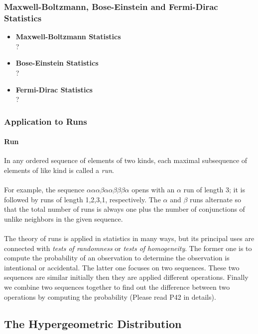 \documentclass{article}
\numberwithin{equation}{subsection}
\begin{document}
		\subsubsection{Maxwell-Boltzmann, Bose-Einstein and Fermi-Dirac Statistics}
		\begin{itemize}
		\item \textbf{Maxwell-Boltzmann Statistics} \\ ?
		\item \textbf{Bose-Einstein Statistics} \\ ?
		\item \textbf{Fermi-Dirac Statistics} \\ ?
		\end{itemize}
		\subsubsection{Application to Runs}
		\paragraph{Run} In any ordered sequence of elements of two kinds, each maximal subsequence of elements of like kind is called a \textit{run}. 
		\paragraph{} For example, the sequence $\alpha\alpha\alpha\beta\alpha\alpha\beta\beta\beta\alpha$ opens with an $\alpha$ run of length 3; it is followed by runs of length 1,2,3,1, respectively. The $\alpha$ and $\beta$ runs alternate so that the total number of runs is always one plus the number of conjunctions of unlike neighbors in the given sequence.
		\paragraph{} The theory of runs is applied in statistics in many ways, but its principal uses are connected with \textit{tests of randomness} or \textit{tests of homogeneity}. The former one is to compute the probability of an observation to determine the observation is intentional or accidental. The latter one focuses on two sequences. These two sequences are similar initially then they are applied different operations. Finally we combine two sequences together to find out the difference between two operations by computing the probability (Please read P42 in details).
		\subsection{The Hypergeometric Distribution}
\end{document}
